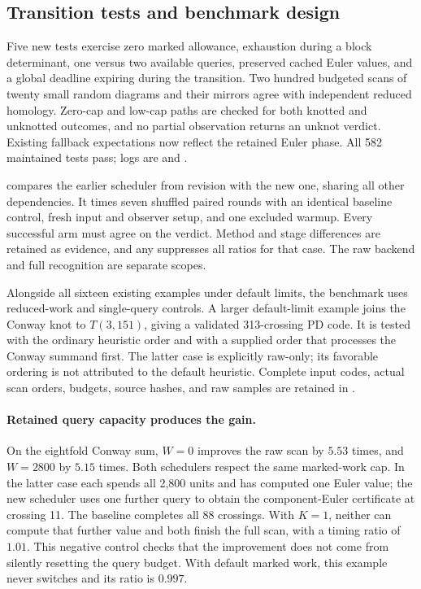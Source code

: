 \subsection{Transition tests and benchmark design}

Five new tests exercise zero marked allowance, exhaustion during a block
determinant, one versus two available queries, preserved cached Euler
values, and a global deadline expiring during the transition.  Two hundred
budgeted scans of twenty small random diagrams and their mirrors agree with
independent reduced homology.  Zero-cap and low-cap paths are checked for
both knotted and unknotted outcomes, and no partial observation returns an
unknot verdict.  Existing fallback expectations now reflect the retained
Euler phase.  All 582 maintained tests pass; logs are
 and
.

 compares the earlier scheduler from
revision  with the new one, sharing all other dependencies.
It times seven shuffled paired rounds with an identical baseline control,
fresh input and observer setup, and one excluded warmup.  Every successful
arm must agree on the verdict.  Method and stage differences are retained
as evidence, and any  suppresses all ratios for that case.
The raw backend and full recognition are separate scopes.

Alongside all sixteen existing examples under default limits, the benchmark
uses reduced-work and single-query controls.  A larger default-limit example
joins the Conway knot to $T(3,151)$, giving a validated 313-crossing PD code.
It is tested with the ordinary heuristic order and with a supplied order
that processes the Conway summand first.  The latter case is explicitly
raw-only; its favorable ordering is not attributed to the default heuristic.
Complete input codes, actual scan orders, budgets, source hashes, and raw
samples are retained in
.



\paragraph{Retained query capacity produces the gain.}
On the eightfold Conway sum, $W=0$ improves the raw scan by $5.53$ times,
and $W=2800$ by $5.15$ times.  Both schedulers respect the same marked-work
cap.  In the latter case each spends all 2,800 units and has computed one
Euler value; the new scheduler uses one further query to obtain the
component-Euler certificate at crossing 11.  The baseline completes all 88
crossings.  With $K=1$, neither can compute that further value and both
finish the full scan, with a timing ratio of $1.01$.  This negative control
checks that the improvement does not come from silently resetting the query
budget.  With default marked work, this example never switches and its ratio
is $0.997$.

